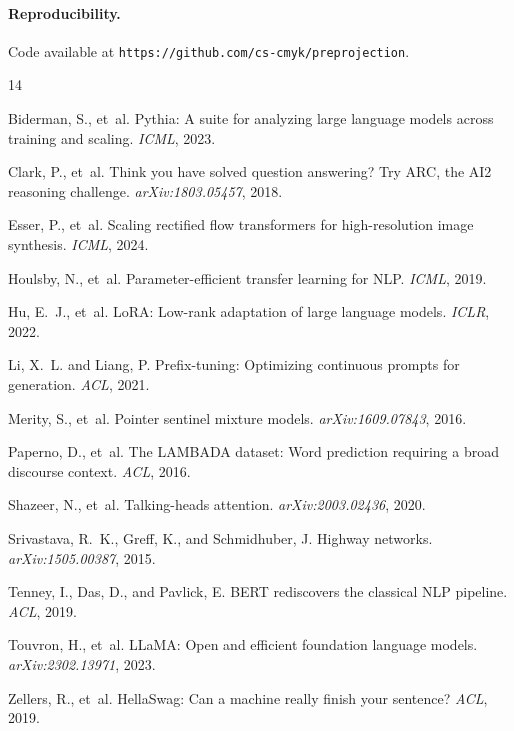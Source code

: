 \documentclass[11pt]{article}
\begin{document}
\paragraph{Reproducibility.} Code available at \texttt{https://github.com/cs-cmyk/preprojection}.


\begin{thebibliography}{14}

Biderman, S., et~al. Pythia: A suite for analyzing large language models across training and scaling. \emph{ICML}, 2023.

Clark, P., et~al. Think you have solved question answering? Try ARC, the AI2 reasoning challenge. \emph{arXiv:1803.05457}, 2018.

Esser, P., et~al. Scaling rectified flow transformers for high-resolution image synthesis. \emph{ICML}, 2024.

Houlsby, N., et~al. Parameter-efficient transfer learning for NLP. \emph{ICML}, 2019.

Hu, E.~J., et~al. LoRA: Low-rank adaptation of large language models. \emph{ICLR}, 2022.

Li, X.~L. and Liang, P. Prefix-tuning: Optimizing continuous prompts for generation. \emph{ACL}, 2021.

Merity, S., et~al. Pointer sentinel mixture models. \emph{arXiv:1609.07843}, 2016.

Paperno, D., et~al. The LAMBADA dataset: Word prediction requiring a broad discourse context. \emph{ACL}, 2016.

Shazeer, N., et~al. Talking-heads attention. \emph{arXiv:2003.02436}, 2020.

Srivastava, R.~K., Greff, K., and Schmidhuber, J. Highway networks. \emph{arXiv:1505.00387}, 2015.

Tenney, I., Das, D., and Pavlick, E. BERT rediscovers the classical NLP pipeline. \emph{ACL}, 2019.

Touvron, H., et~al. LLaMA: Open and efficient foundation language models. \emph{arXiv:2302.13971}, 2023.

Zellers, R., et~al. HellaSwag: Can a machine really finish your sentence? \emph{ACL}, 2019.

\end{thebibliography}
\end{document}
